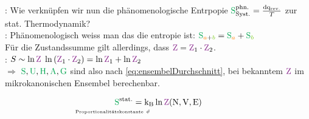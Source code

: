 \begin{sectionbox}\nospacing
  : Wie verknüpfen wir nun die phänomenologische Entrpopie $\Spotp_{\text{Syst.}}=\frac{\diff\qp_{\text{rev.}}}{T}$ zur stat. Thermodynamik?\\
  : Phänomenologisch weiss man das die entropie  ist: $\Spot_{\mca+\mcb}=\Spot_{\mca}+\Spot_{\mcb}$\\
  Für die Zustandssumme gilt allerdings, dass $\Zz=\Zz_1\cdot\Zz_2$.\\
  : $S\sim\ln\Zz$  $\ln\left(\Zz_1\cdot\Zz_2\right)=\ln\Zz_1+\ln\Zz_2$\\
  $\Rightarrow$ $\Spot,\Upot,\Hpot,\Apot,\Gpot$ sind also nach \cref{eq:ensembelDurchschnitt}, bei bekanntem $\Zz$ im mikrokanonischen
  Ensembel berechenbar.
\end{sectionbox}
\begin{defnbox}\nospacing
  \begin{defn}
    \begin{equation}
      \Spots=\bdla{\kb}{\normalfont{Proportionalitätskonstante}}\ln\Zzm
    \end{equation}
  \end{defn}
\end{defnbox}

